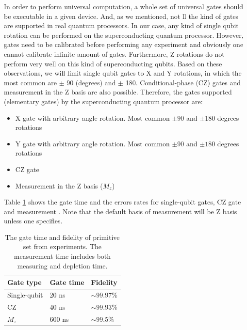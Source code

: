In order to perform universal computation, a whole set of universal gates should be executable in a given device.
And, as we mentioned, not ll the kind of gates are supported in real quantum processors.
In our case, any kind of single qubit rotation can be performed on the superconducting quantum processor. However, gates need to be calibrated before performing any experiment and obviously one cannot calibrate infinite amount of gates. Furthermore, Z rotations do not perform very well on this kind of superconducting qubits. Based on these observations, we will limit single qubit gates to X and Y rotations, in which the most common are  $\pm$ 90 (degrees) and $\pm$ 180. Conditional-phase (CZ) gates and measurement in the Z basis are also possible. Therefore, the gates supported (elementary gates) by the superconducting quantum processor are:

\begin{itemize}
\item X gate with arbitrary angle rotation. Most common  \(\pm 90\) and \(\pm180\) degrees rotations
\item Y gate with arbitrary angle rotation. Most common  \(\pm 90\) and \(\pm180\) degrees rotations
\item CZ gate 
\item Measurement in the Z basis ($M_{z}$)
\end{itemize}

Table \ref{primitive_gate_time} shows the gate time and the errors rates for single-qubit gates, CZ gate and measurement \cite{versluis2016scalable}. Note that the default basis of measurement will be Z basis unless one specifies.

\begin{table}[h!]
\centering
\caption{The gate time and fidelity of primitive set from experiments. The measurement time includes both measuring and depletion time.}
\label{primitive_gate_time}
\begin{tabular}{lll}
\hline  
\textbf{Gate type}    & \textbf{Gate time} & \textbf{Fidelity}       \\
\hline
Single-qubit & 20 ns     &  $\sim 99.97 \%$ \\
CZ           & 40 ns     & $\sim 99.93 \%$           \\
$M_{z}$  & 600 ns    & $\sim 99.5 \%$     \\  
\hline
\end{tabular}
\end{table}

